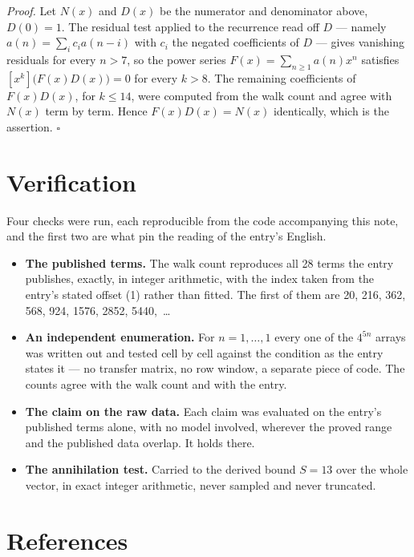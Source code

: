 \documentclass[11pt]{article}
\theoremstyle{definition}
\begin{document}
{\itshape Proof.} Let $N(x)$ and $D(x)$ be the numerator and denominator above, $D(0)=1$. The residual test applied to the recurrence read off $D$ --- namely $a(n) = \sum_i c_i a(n-i)$ with $c_i$ the negated coefficients of $D$ --- gives vanishing residuals for every $n > 7$, so the power series $F(x)=\sum_{n\ge 1}a(n)x^n$ satisfies $[x^k]\bigl(F(x)D(x)\bigr) = 0$ for every $k > 8$. The remaining coefficients of $F(x)D(x)$, for $k \le 14$, were computed from the walk count and agree with $N(x)$ term by term. Hence $F(x)D(x) = N(x)$ identically, which is the assertion. $\square$

\section{Verification}

Four checks were run, each reproducible from the code accompanying this note, and the first two are what pin the reading of the entry's English.

\begin{itemize}

\item {\bfseries The published terms.} The walk count reproduces all 28 terms the entry publishes, exactly, in integer arithmetic, with the index taken from the entry's stated offset (1) rather than fitted. The first of them are 20, 216, 362, 568, 924, 1576, 2852, 5440,~\dots

\item {\bfseries An independent enumeration.} For $n = 1,\dots,1$ every one of the $4^{5n}$ arrays was written out and tested cell by cell against the condition as the entry states it --- no transfer matrix, no row window, a separate piece of code. The counts agree with the walk count and with the entry.

\item {\bfseries The claim on the raw data.} Each claim was evaluated on the entry's published terms alone, with no model involved, wherever the proved range and the published data overlap. It holds there.

\item {\bfseries The annihilation test.} Carried to the derived bound $S = 13$ over the whole vector, in exact integer arithmetic, never sampled and never truncated.

\end{itemize}

\section{References}
\end{document}
